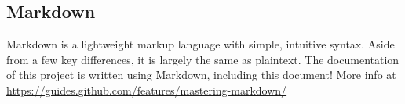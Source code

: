 \subsection{Markdown}

Markdown is a lightweight markup language with simple, intuitive syntax. Aside from a few key differences, it is largely the same as plaintext. The documentation of this project is written using Markdown, including this document! More info at \url{https://guides.github.com/features/mastering-markdown/}
